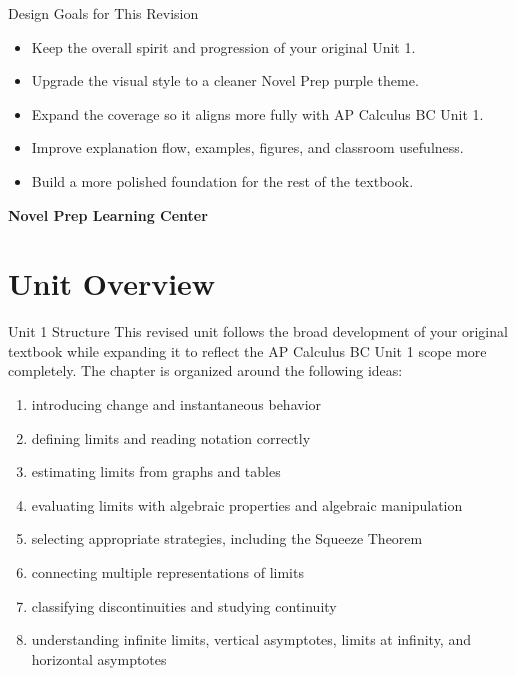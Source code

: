 \documentclass[11pt]{article}
\begin{document}
\begin{titlepage}
\begin{minipage}{0.83\textwidth}
\begin{notebox}{Design Goals for This Revision}
\begin{itemize}
    \item Keep the overall spirit and progression of your original Unit 1.
    \item Upgrade the visual style to a cleaner Novel Prep purple theme.
    \item Expand the coverage so it aligns more fully with AP Calculus BC Unit 1.
    \item Improve explanation flow, examples, figures, and classroom usefulness.
    \item Build a more polished foundation for the rest of the textbook.
\end{itemize}
\end{notebox}
\end{minipage}

\vfill

{\large\textbf{Novel Prep Learning Center}}\\[0.25em]

\end{titlepage}

\clearpage
\thispagestyle{fancy}
\tableofcontents
\newpage

\section*{Unit Overview}

\begin{skillbox}{Unit 1 Structure}
This revised unit follows the broad development of your original textbook while expanding it to reflect the AP Calculus BC Unit 1 scope more completely. The chapter is organized around the following ideas:
\begin{enumerate}
    \item introducing change and instantaneous behavior
    \item defining limits and reading notation correctly
    \item estimating limits from graphs and tables
    \item evaluating limits with algebraic properties and algebraic manipulation
    \item selecting appropriate strategies, including the Squeeze Theorem
    \item connecting multiple representations of limits
    \item classifying discontinuities and studying continuity
    \item understanding infinite limits, vertical asymptotes, limits at infinity, and horizontal asymptotes
\end{enumerate}
\end{skillbox}
\end{document}
